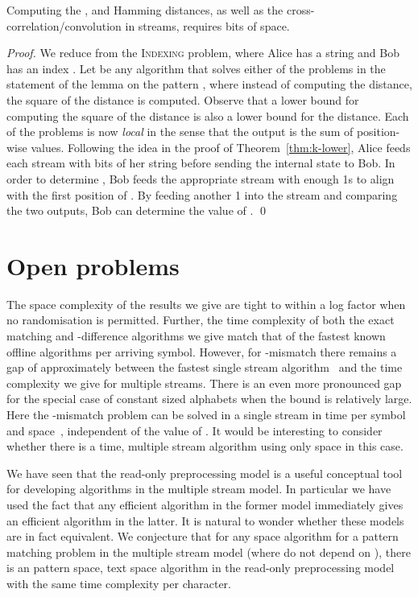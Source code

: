 \documentclass[envcountsame]{llncs}
\newcommand{\indexing}{\textsc{Indexing}\xspace}
\begin{document}
\begin{theorem}
    Computing the ,  and Hamming distances, as well as the cross-correlation/convolution in  streams, requires  bits of space.
\end{theorem}
\begin{proof}
    We reduce from the \indexing problem, where Alice has a string  and Bob has an index . Let  be any algorithm that solves either of the problems in the statement of the lemma on the pattern , where instead of computing the
     distance, the square of the distance is computed. Observe that a lower bound for computing the square of the  distance is also a lower bound for the  distance. Each of the problems is now \emph{local} in the sense that the output is the sum of  position-wise values. Following the idea in the proof of Theorem~\ref{thm:k-lower}, Alice feeds each stream with  bits of her string  before sending the internal state to Bob. In order to determine , Bob feeds the appropriate stream  with enough 1s to align  with the first position of . By feeding another 1 into the stream  and comparing the two outputs, Bob can determine the value of .
    \qed
\end{proof}


\section{Open problems}\label{sec:open}

The space complexity of the results we give are tight to within a log factor when no randomisation is permitted. Further, the time complexity of both the exact matching and -difference algorithms we give match that of the fastest known offline algorithms per arriving symbol.  However, for -mismatch there remains a gap of approximately  between the fastest single stream algorithm~\cite{CS:2010} and the time complexity we give for multiple streams. There is an even more pronounced gap for the special case of constant sized alphabets when the bound  is relatively large. Here the -mismatch problem can be solved in a single stream in  time per symbol and  space~\cite{CEPP:2008}, independent of the value of . It would be interesting to consider whether there is a  time, multiple stream algorithm using only  space in this case.

We have seen that the read-only preprocessing model is a useful
conceptual tool for developing algorithms in the multiple stream
model. In particular we have used the fact that any efficient algorithm in the former model immediately gives an efficient algorithm in the latter. It is natural to wonder whether these models are in fact equivalent. We conjecture that for any  space algorithm for a pattern matching problem in the multiple stream model (where  do not depend on ), there is an  pattern space,  text space algorithm in the read-only preprocessing model with the same time complexity per character.
\end{document}
